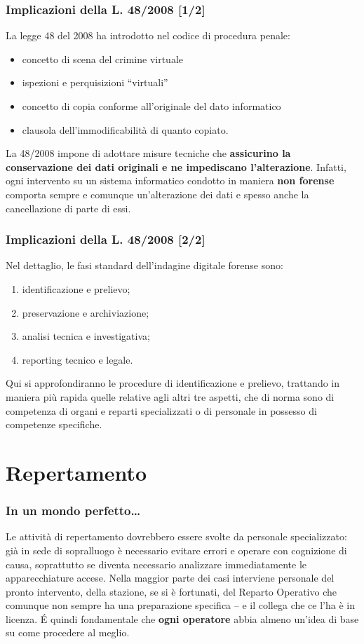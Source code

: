 \documentclass[11pt]{beamer}
\begin{document}
	\begin{frame}
		\frametitle{Implicazioni della L. 48/2008 [1/2]}
		La legge 48 del 2008 ha introdotto nel codice di procedura penale:
		\begin{itemize}
		\item concetto di scena del crimine virtuale
		\item ispezioni e perquisizioni ``virtuali''
		\item concetto di copia conforme all'originale del dato informatico
		\item clausola dell'immodificabilità di quanto copiato.
		\end{itemize}		
		\vfill
		La 48/2008 impone di adottare misure tecniche che \textbf{assicurino la conservazione dei dati originali e ne impediscano l'alterazione}.
		\vfill
		Infatti, ogni intervento su un sistema informatico  condotto in maniera \textbf{non forense} comporta sempre e comunque un'alterazione dei dati e spesso anche la cancellazione di parte di essi.
	\end{frame}
	\begin{frame}
		\frametitle{Implicazioni della L. 48/2008 [2/2]}	
		Nel dettaglio, le fasi standard dell'indagine digitale forense sono:
		\begin{enumerate}
			\item identificazione e prelievo;
			\item preservazione e archiviazione;
			\item analisi tecnica e investigativa;
			\item reporting tecnico e legale.
		\end{enumerate}
		\vfill
		Qui si approfondiranno le procedure di identificazione e prelievo, trattando in maniera più rapida quelle relative agli altri tre aspetti, che di norma sono di competenza di organi e reparti specializzati o di personale in possesso di competenze specifiche.
	\end{frame}
	
	\section{Repertamento}
	
	\begin{frame}
		\frametitle{In un mondo perfetto\dots}
		Le attività di repertamento dovrebbero essere svolte da personale specializzato: già in sede di sopralluogo è necessario evitare errori e operare con cognizione di causa, soprattutto se diventa necessario analizzare immediatamente le apparecchiature accese.
		\vfill
		Nella maggior parte dei casi interviene personale del pronto intervento, della stazione, se si è fortunati, del Reparto Operativo che comunque non sempre ha una preparazione specifica -- e il collega che ce l'ha è in licenza. 
		\vfill
		\'{E} quindi fondamentale che \textbf{ogni operatore} abbia almeno un'idea di base su come procedere al meglio.
	\end{frame}
	
\end{document}
